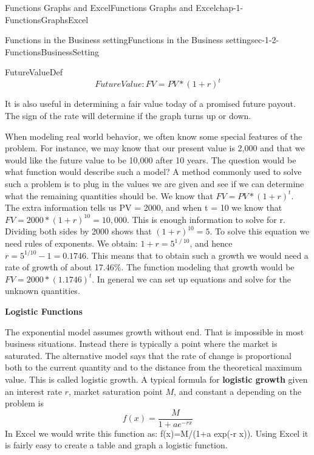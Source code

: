 \documentclass[oneside,10pt,]{book}
\newcommand{\terminology}[1]{\textbf{#1}}
\numberwithin{equation}{section}
\begin{document}
\begin{chapterptx}{Functions Graphs and Excel}{}{Functions Graphs and Excel}{}{}{chap-1-FunctionsGraphsExcel}
\begin{sectionptx}{Functions in the Business setting}{}{Functions in the Business setting}{}{}{sec-1-2-FunctionsBusinessSetting}
\begin{assemblage}{}{FutureValueDef}%
\hypertarget{p-150}{}%
%
\begin{equation*}
Future Value: FV=PV*(1+r)^t
\end{equation*}
%
\end{assemblage}
\hypertarget{p-151}{}%
It is also useful in determining a fair value today of a promised future payout. The sign of the rate will determine if the graph turns up or down.%
\par
\hypertarget{p-152}{}%
When modeling real world behavior, we often know some special features of the problem. For instance, we may know that our present value is \textdollar{}2,000 and that we would like the future value to be \textdollar{}10,000 after 10 years. The question would be what function would describe such a model? A method commonly used to solve such a problem is to plug in the values we are given and see if we can determine what the remaining quantities should be. We know that \(FV=PV*(1+r)^t\). The extra information tells us PV = 2000, and when t = 10 we know that \(FV=2000*(1+r)^{10}=10,000\). This is enough information to solve for r. Dividing both sides by 2000 shows that \((1+r)^{10}=5\). To solve this equation we need rules of exponents. We obtain: \(1+r=5^{1⁄10}\), and hence \(r= 5^{1/10}-1= 0.1746\). This means that to obtain such a growth we would need a rate of growth of about 17.46\%. The function modeling that growth would be \(FV=2000*(1.1746)^t\). In general we can set up equations and solve for the unknown quantities.%
\par
\hypertarget{p-153}{}%
\terminology{Logistic Functions}%
\par
\hypertarget{p-154}{}%
The exponential model assumes growth without end.  That is impossible in most business situations.  Instead there is typically a point where the market is saturated.  The alternative model says that the rate of change is proportional both to the current quantity and to the distance from the theoretical maximum value.  This is called logistic growth.  A typical formula for \terminology{logistic growth} given an interest rate \(r\), market saturation point \(M\), and constant a depending on the problem is%
%
\begin{equation*}
f(x)=  \frac{M}{1+a e^{-rx}} 
\end{equation*}
\hypertarget{p-155}{}%
In Excel we would write this function as: f(x)=M\slash{}(1+a exp(-r x)). Using Excel it is fairly easy to create a table and graph a logistic function.%
\begin{sidebyside}{1}{0.25}{0.25}{0}%

\end{sidebyside}
\end{sectionptx}
\end{chapterptx}
\end{document}
